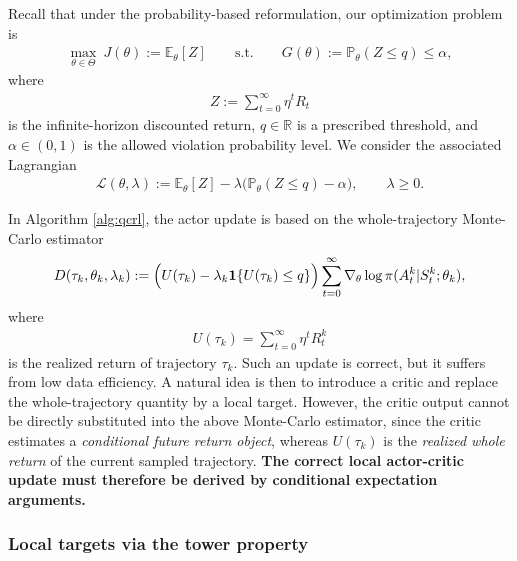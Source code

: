 Recall that under the probability-based reformulation, our optimization problem is
\begin{align}
    \max_{\theta\in\Theta}~J(\theta):=\mathbb{E}_{\theta}[Z]
    \qquad \text{s.t.} \qquad
    G(\theta):=\mathbb{P}_{\theta}(Z\le q)\le \alpha,
\end{align}
where
\begin{align}
    Z:=\sum_{t=0}^{\infty}\eta^tR_t
\end{align}
is the infinite-horizon discounted return, $q\in\mathbb{R}$ is a prescribed threshold, and $\alpha\in(0,1)$ is the allowed violation probability level. We consider the associated Lagrangian
\begin{align}
    \mathcal{L}(\theta,\lambda)
    :=
    \mathbb{E}_{\theta}[Z]
    -
    \lambda\bigl(\mathbb{P}_{\theta}(Z\le q)-\alpha\bigr),
    \qquad \lambda\ge 0.
\end{align}

In Algorithm \ref{alg:qcrl}, the actor update is based on the whole-trajectory Monte-Carlo estimator
\begin{align}
    D(\tau_k,\theta_k,\lambda_k)
    :=
    \Bigl(
        U(\tau_k)-\lambda_k\mathbf{1}\{U(\tau_k)\le q\}
    \Bigr)
    \sum_{t=0}^{\infty}
    \nabla_{\theta}\log\pi(A_t^k|S_t^k;\theta_k),
\end{align}
where
\begin{align}
    U(\tau_k)=\sum_{t=0}^{\infty}\eta^tR_t^k
\end{align}
is the realized return of trajectory $\tau_k$. Such an update is correct, but it suffers from low data efficiency. A natural idea is then to introduce a critic and replace the whole-trajectory quantity by a local target. \textcolor{ECNURed}{However, the critic output cannot be directly substituted into the above Monte-Carlo estimator, since the critic estimates a \emph{conditional future return object}, whereas $U(\tau_k)$ is the \emph{realized whole return} of the current sampled trajectory. }\textbf{The correct local actor-critic update must therefore be derived by conditional expectation arguments.}

\subsubsection{Local targets via the tower property}


